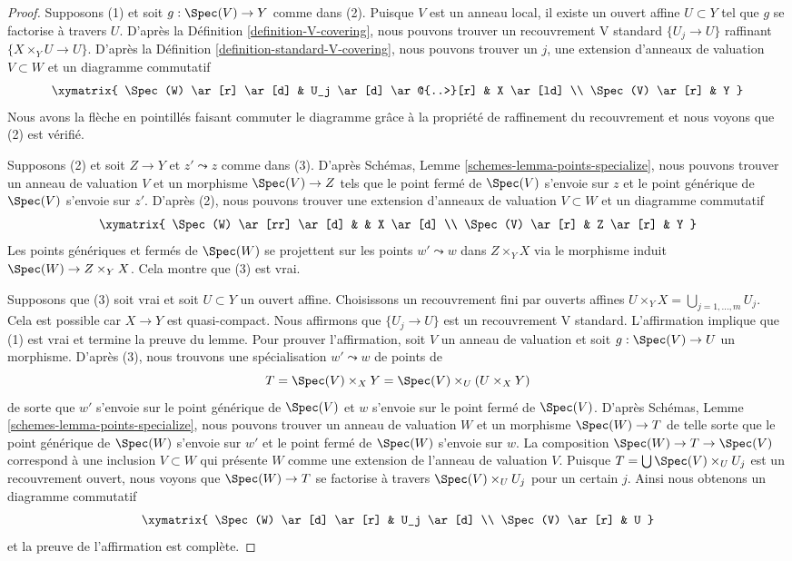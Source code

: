 \begin{proof}
Supposons (1) et soit $g : \Spec(V) \to Y$ comme dans (2). Puisque $V$ est un anneau local, il existe un ouvert affine $U \subset Y$ tel que $g$ se factorise à travers $U$. D'après la Définition \ref{definition-V-covering}, nous pouvons trouver un recouvrement V standard $\{U_j \to U\}$ raffinant $\{X \times_Y U \to U\}$. D'après la Définition \ref{definition-standard-V-covering}, nous pouvons trouver un $j$, une extension d'anneaux de valuation $V \subset W$ et un diagramme commutatif
$$
\xymatrix{
\Spec(W) \ar[r] \ar[d] & U_j \ar[d] \ar@{..>}[r] & X \ar[ld] \\
\Spec(V) \ar[r] & Y
}
$$
Nous avons la flèche en pointillés faisant commuter le diagramme grâce à la propriété de raffinement du recouvrement et nous voyons que (2) est vérifié.

\medskip\noindent
Supposons (2) et soit $Z \to Y$ et $z' \leadsto z$ comme dans (3). D'après Schémas, Lemme \ref{schemes-lemma-points-specialize}, nous pouvons trouver un anneau de valuation $V$ et un morphisme $\Spec(V) \to Z$ tels que le point fermé de $\Spec(V)$ s'envoie sur $z$ et le point générique de $\Spec(V)$ s'envoie sur $z'$. D'après (2), nous pouvons trouver une extension d'anneaux de valuation $V \subset W$ et un diagramme commutatif
$$
\xymatrix{
\Spec(W) \ar[rr] \ar[d] & & X \ar[d] \\
\Spec(V) \ar[r] & Z \ar[r] & Y
}
$$
Les points génériques et fermés de $\Spec(W)$ se projettent sur les points $w' \leadsto w$ dans $Z \times_Y X$ via le morphisme induit $\Spec(W) \to Z \times_Y X$. Cela montre que (3) est vrai.

\medskip\noindent
Supposons que (3) soit vrai et soit $U \subset Y$ un ouvert affine. Choisissons un recouvrement fini par ouverts affines $U \times_Y X = \bigcup_{j = 1, \ldots, m} U_j$. Cela est possible car $X \to Y$ est quasi-compact. Nous affirmons que $\{U_j \to U\}$ est un recouvrement V standard. L’affirmation implique que (1) est vrai et termine la preuve du lemme. Pour prouver l’affirmation, soit $V$ un anneau de valuation et soit $g : \Spec(V) \to U$ un morphisme. D’après (3), nous trouvons une spécialisation $w' \leadsto w$ de points de
$$
T = \Spec(V) \times_X Y = \Spec(V) \times_U (U \times_X Y)
$$
de sorte que $w'$ s'envoie sur le point générique de $\Spec(V)$ et $w$ s'envoie sur le point fermé de $\Spec(V)$. D'après Schémas, Lemme \ref{schemes-lemma-points-specialize}, nous pouvons trouver un anneau de valuation $W$ et un morphisme $\Spec(W) \to T$ de telle sorte que le point générique de $\Spec(W)$ s'envoie sur $w'$ et le point fermé de $\Spec(W)$ s'envoie sur $w$. La composition $\Spec(W) \to T \to \Spec(V)$ correspond à une inclusion $V \subset W$ qui présente $W$ comme une extension de l'anneau de valuation $V$. Puisque $T = \bigcup \Spec(V) \times_U U_j$ est un recouvrement ouvert, nous voyons que $\Spec(W) \to T$ se factorise à travers $\Spec(V) \times_U U_j$ pour un certain $j$. Ainsi nous obtenons un diagramme commutatif
$$
\xymatrix{
\Spec(W) \ar[d] \ar[r] & U_j \ar[d] \\
\Spec(V) \ar[r] & U
}
$$
et la preuve de l'affirmation est complète.
\end{proof}

